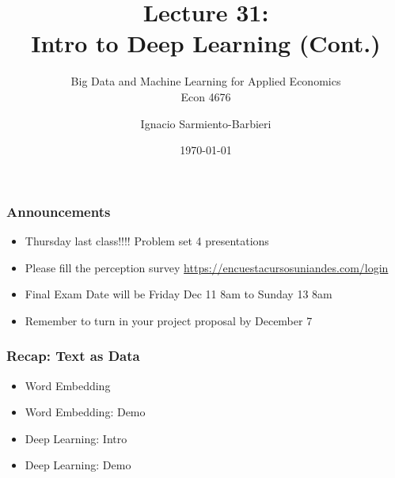\documentclass[
  shownotes,
  xcolor={svgnames},
  hyperref={colorlinks,citecolor=DarkBlue,linkcolor=DarkRed,urlcolor=DarkBlue}
  , aspectratio=169]{beamer}
\begin{document}
\title[Lecture 31]{Lecture 31: \\  Intro to Deep Learning (Cont.) }
\subtitle{Big Data and Machine Learning for Applied Economics \\ Econ 4676}
\date{\today}

\author[Sarmiento-Barbieri]{Ignacio Sarmiento-Barbieri}


\begin{frame}[noframenumbering]
\maketitle
\end{frame}





\begin{frame}
\frametitle{Announcements }


\begin{itemize} 
    \item  Thursday last class!!!! Problem set 4 presentations
    \bigskip
    \item Please fill the perception survey \url{https://encuestacursosuniandes.com/login}
    \bigskip
    \item  Final Exam Date will be Friday Dec 11 8am to Sunday 13 8am
    \bigskip
    \item  Remember to turn in your project proposal by December 7
    
\end{itemize}
\end{frame}

\begin{frame}
\frametitle{Recap: Text as Data}

\begin{itemize} 
  

\item  Word Embedding
\bigskip
\item  Word Embedding: Demo
\bigskip
\item  Deep Learning: Intro
\bigskip
\item  Deep Learning: Demo
\bigskip

\end{itemize}
  
\end{frame}
\end{document}
